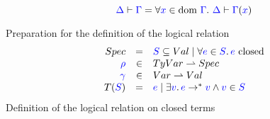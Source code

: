 \documentclass{article}
\theoremstyle{definition}
\newcommand{\meta}[1]{{\color{blue}#1}}
\newcommand{\dom}[1]{\ensuremath{\text{dom}\ #1}}
\begin{document}
  \boxed{\meta{\Delta}\vdash\meta{\Gamma}}\vspace{-3mm}
  \[
    \meta{\Delta}\vdash\meta{\Gamma} = \forall\meta{x}\in\dom{\meta{\Gamma}}.\ \meta{\Delta}\vdash\meta{\Gamma}(\meta{x})
  \]
  \boxed{\meta{\Delta}\vdash\meta{\tau}}\vspace{-7mm}
  \hfill{}Preparation for the definition of the logical relation\hfill{}
  \[
    \begin{array}{rcl}
      Spec & = & \set{\meta{S} \subseteq Val \mid \forall\meta{e}\in \meta{S}.\,\meta{e}\text{ closed}}\\
      \meta{\rho} & \in & TyVar \rightharpoonup Spec\\
      \meta{\gamma} & \in & Var \rightharpoonup Val\\
      T(\meta{S}) & = & \set{\meta{e} \mid\exists{\meta{v}}.\, \meta{e}\to^*\meta{v} \wedge \meta{v}\in\meta{S}}
    \end{array}
  \]
  \hfill{}Definition of the logical relation on closed terms\hfill{}
\end{document}
